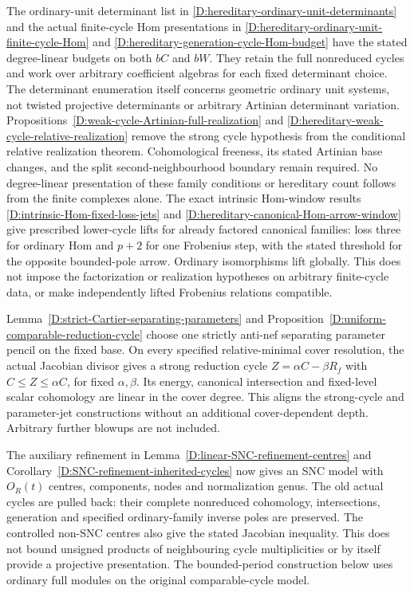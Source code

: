 The ordinary-unit determinant list in
\ref{D:hereditary-ordinary-unit-determinants} and the actual finite-cycle
Hom presentations in
\ref{D:hereditary-ordinary-unit-finite-cycle-Hom} and
\ref{D:hereditary-generation-cycle-Hom-budget} have the stated
degree-linear budgets on both $bC$ and $bW$. They retain the full
nonreduced cycles and work over arbitrary coefficient algebras for
each fixed determinant choice. The determinant enumeration itself
concerns geometric ordinary unit systems, not twisted projective
determinants or arbitrary Artinian determinant variation.
Propositions~\ref{D:weak-cycle-Artinian-full-realization} and
\ref{D:hereditary-weak-cycle-relative-realization} remove the strong
cycle hypothesis from the conditional relative realization theorem.
Cohomological freeness, its stated Artinian base changes, and the
split second-neighbourhood boundary remain required. No degree-linear
presentation of these family conditions or hereditary count follows
from the finite complexes alone.
The exact intrinsic Hom-window results
\ref{D:intrinsic-Hom-fixed-loss-jets} and
\ref{D:hereditary-canonical-Hom-arrow-window} give prescribed
lower-cycle lifts for already factored canonical families: loss
three for ordinary Hom and $p+2$ for one Frobenius step, with the
stated threshold for the opposite bounded-pole arrow. Ordinary
isomorphisms lift globally. This does not impose the factorization
or realization hypotheses on arbitrary finite-cycle data, or make
independently lifted Frobenius relations compatible.

Lemma~\ref{D:strict-Cartier-separating-parameters} and
Proposition~\ref{D:uniform-comparable-reduction-cycle} choose one
strictly anti-nef separating parameter pencil on the fixed base.
On every specified relative-minimal cover resolution, the actual
Jacobian divisor gives a strong reduction cycle
$Z=\alpha C-\beta R_f$ with $C\le Z\le\alpha C$, for fixed
$\alpha,\beta$. Its energy, canonical intersection and fixed-level
scalar cohomology are linear in the cover degree. This aligns the
strong-cycle and parameter-jet constructions without an additional
cover-dependent depth. Arbitrary further blowups are not included.

The auxiliary refinement in
Lemma~\ref{D:linear-SNC-refinement-centres} and
Corollary~\ref{D:SNC-refinement-inherited-cycles} now gives an SNC
model with $O_R(t)$ centres, components, nodes and normalization
genus. The old actual cycles are pulled back: their complete
nonreduced cohomology, intersections, generation and specified
ordinary-family inverse poles are preserved. The controlled
non-SNC centres also give the stated Jacobian inequality.
This does not bound unsigned products of neighbouring cycle
multiplicities or by itself provide a projective presentation.
The bounded-period construction below uses ordinary full modules
on the original comparable-cycle model.

